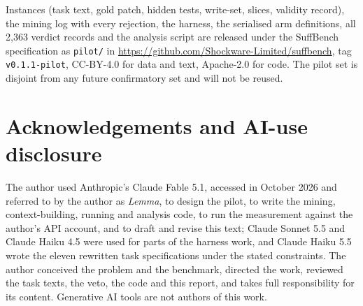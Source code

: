 \documentclass[10pt]{article}
\begin{document}
Instances (task text, gold patch, hidden tests, write-set, slices, validity record), the mining log with every rejection, the harness, the serialised arm definitions, all 2,363 verdict records and the analysis script are released under the SuffBench specification as \texttt{pilot/} in \url{https://github.com/Shockware-Limited/suffbench}, tag \texttt{v0.1.1-pilot}, CC-BY-4.0 for data and text, Apache-2.0 for code. The pilot set is disjoint from any future confirmatory set and will not be reused.

\section*{Acknowledgements and AI-use disclosure}

The author used Anthropic's Claude Fable 5.1, accessed in October 2026 and referred to by the author as \emph{Lemma}, to design the pilot, to write the mining, context-building, running and analysis code, to run the measurement against the author's API account, and to draft and revise this text; Claude Sonnet 5.5 and Claude Haiku 4.5 were used for parts of the harness work, and Claude Haiku 5.5 wrote the eleven rewritten task specifications under the stated constraints. The author conceived the problem and the benchmark, directed the work, reviewed the task texts, the veto, the code and this report, and takes full responsibility for its content. Generative AI tools are not authors of this work.



\end{document}
